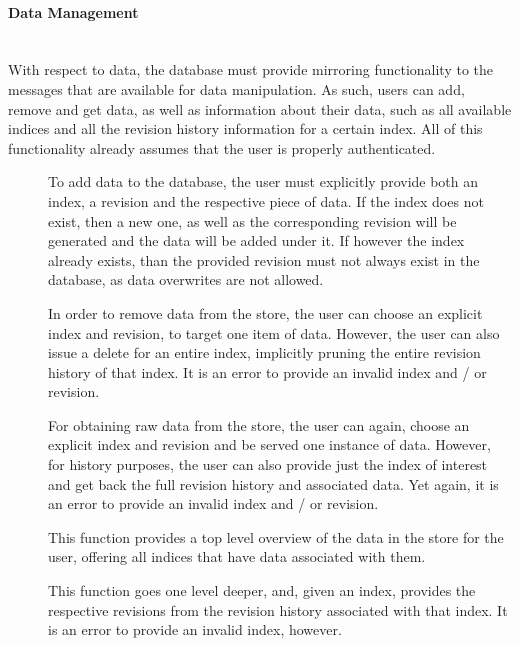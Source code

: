 \paragraph{Data Management} ~\\
With respect to data, the database must provide mirroring functionality to the messages that are available for data manipulation.
As such, users can add, remove and get data, as well as information about their data, such as all available indices and all the revision history information for a certain index.
All of this functionality already assumes that the user is properly authenticated.
\begin{description}
\item[]
To add data to the database, the user must explicitly provide both an index, a revision and the respective piece of data.
If the index does not exist, then a new one, as well as the corresponding revision will be generated and the data will be added under it.
If however the index already exists, than the provided revision must not always exist in the database, as data overwrites are not allowed.

\item[]
In order to remove data from the store, the user can choose an explicit index and revision, to target one item of data.
However, the user can also issue a delete for an entire index, implicitly pruning the entire revision history of that index.
It is an error to provide an invalid index and / or revision.

\item[]
For obtaining raw data from the store, the user can again, choose an explicit index and revision and be served one instance of data.
However, for history purposes, the user can also provide just the index of interest and get back the full revision history and associated data.
Yet again, it is an error to provide an invalid index and / or revision.

\item[]
This function provides a top level overview of the data in the store for the user, offering all indices that have data associated with them.

\item[]
This function goes one level deeper, and, given an index, provides the respective revisions from the revision history associated with that index.
It is an error to provide an invalid index, however.
\end{description}

